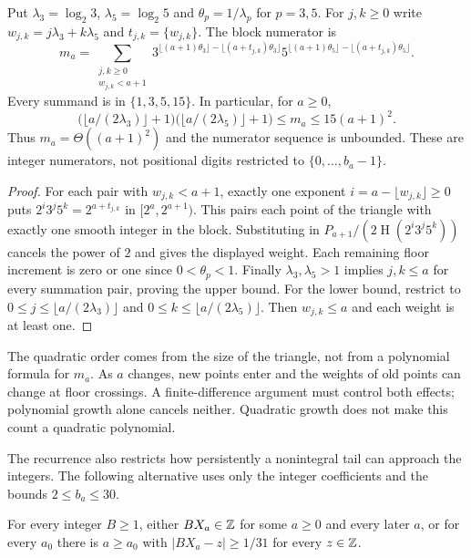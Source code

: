 \documentclass[11pt]{article}
\theoremstyle{remark}
\theoremstyle{plain}
\newcommand{\hgt}{\operatorname{H}}
\begin{document}
\begin{lemma}
\label{long269:res:literal-triangle}
Put $\lambda_3=\log_2 3$, $\lambda_5=\log_2 5$ and
$\theta_p=1/\lambda_p$ for $p=3,5$.
For $j,k\ge0$ write $w_{j,k}=j\lambda_3+k\lambda_5$ and
$t_{j,k}=\{w_{j,k}\}$.  The block numerator is
\[
 m_a=\sum_{\substack{j,k\ge0\\w_{j,k}<a+1}}
 3^{\lfloor(a+1)\theta_3\rfloor-\lfloor(a+t_{j,k})\theta_3\rfloor}
 5^{\lfloor(a+1)\theta_5\rfloor-\lfloor(a+t_{j,k})\theta_5\rfloor}.
\]
Every summand is in $\{1,3,5,15\}$.  In particular, for $a\ge0$,
\[
 \bigl(\lfloor a/(2\lambda_3)\rfloor+1\bigr)
 \bigl(\lfloor a/(2\lambda_5)\rfloor+1\bigr)
 \le m_a\le15(a+1)^2.
\]
Thus $m_a=\Theta((a+1)^2)$ and the numerator sequence is unbounded.
These are integer numerators, not positional digits restricted to
$\{0,\ldots,b_a-1\}$.
\end{lemma}
\begin{proof}
For each pair with $w_{j,k}<a+1$, exactly one exponent
$i=a-\lfloor w_{j,k}\rfloor\ge0$ puts
$2^i3^j5^k=2^{a+t_{j,k}}$ in $[2^a,2^{a+1})$.
This pairs each point of the triangle with exactly one smooth integer
in the block.  Substituting in
$P_{a+1}/(2\hgt(2^i3^j5^k))$ cancels the power of $2$ and gives the displayed
weight.  Each remaining floor increment is zero or one since
$0<\theta_p<1$.  Finally $\lambda_3,\lambda_5>1$ implies
$j,k\le a$ for every summation pair, proving the upper bound.
For the lower bound, restrict to
$0\le j\le\lfloor a/(2\lambda_3)\rfloor$ and
$0\le k\le\lfloor a/(2\lambda_5)\rfloor$.
Then $w_{j,k}\le a$ and each weight is at least one.
\end{proof}
The quadratic order comes from the size of the triangle, not from a
polynomial formula for $m_a$. As $a$ changes, new points enter and the
weights of old points can change at floor crossings. A finite-difference
argument must control both effects; polynomial growth alone cancels neither.
Quadratic growth does not make this count a quadratic polynomial.

The recurrence also restricts how persistently a nonintegral tail can
approach the integers.  The following alternative uses only the integer
coefficients and the bounds $2\le b_a\le30$.

\begin{proposition}\label{long269:res:actual-dichotomy}
For every integer $B\ge1$, either $BX_a\in\mathbb{Z}$ for some $a\ge0$ and every
later $a$, or for every $a_0$ there is $a\ge a_0$ with
$|BX_a-z|\ge1/31$ for every $z\in\mathbb{Z}$.
\end{proposition}
\end{document}

